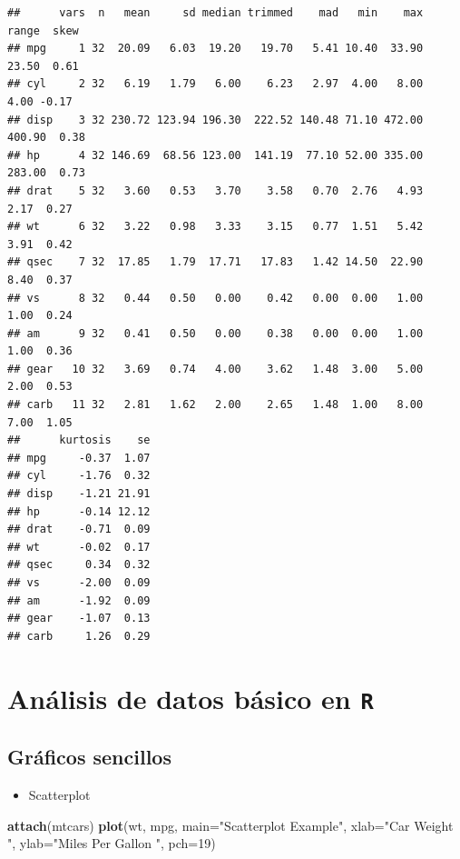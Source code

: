 \documentclass[]{article}
\def\tightlist{}
\newenvironment{Shaded}{\begin{snugshade}}{\end{snugshade}}
\newcommand{\KeywordTok}[1]{\textcolor[rgb]{0.13,0.29,0.53}{\textbf{{#1}}}}
\newcommand{\DataTypeTok}[1]{\textcolor[rgb]{0.13,0.29,0.53}{{#1}}}
\newcommand{\DecValTok}[1]{\textcolor[rgb]{0.00,0.00,0.81}{{#1}}}
\newcommand{\StringTok}[1]{\textcolor[rgb]{0.31,0.60,0.02}{{#1}}}
\newcommand{\NormalTok}[1]{{#1}}
\numberwithin{equation}{section}
\begin{document}
\begin{verbatim}
##      vars  n   mean     sd median trimmed    mad   min    max  range  skew
## mpg     1 32  20.09   6.03  19.20   19.70   5.41 10.40  33.90  23.50  0.61
## cyl     2 32   6.19   1.79   6.00    6.23   2.97  4.00   8.00   4.00 -0.17
## disp    3 32 230.72 123.94 196.30  222.52 140.48 71.10 472.00 400.90  0.38
## hp      4 32 146.69  68.56 123.00  141.19  77.10 52.00 335.00 283.00  0.73
## drat    5 32   3.60   0.53   3.70    3.58   0.70  2.76   4.93   2.17  0.27
## wt      6 32   3.22   0.98   3.33    3.15   0.77  1.51   5.42   3.91  0.42
## qsec    7 32  17.85   1.79  17.71   17.83   1.42 14.50  22.90   8.40  0.37
## vs      8 32   0.44   0.50   0.00    0.42   0.00  0.00   1.00   1.00  0.24
## am      9 32   0.41   0.50   0.00    0.38   0.00  0.00   1.00   1.00  0.36
## gear   10 32   3.69   0.74   4.00    3.62   1.48  3.00   5.00   2.00  0.53
## carb   11 32   2.81   1.62   2.00    2.65   1.48  1.00   8.00   7.00  1.05
##      kurtosis    se
## mpg     -0.37  1.07
## cyl     -1.76  0.32
## disp    -1.21 21.91
## hp      -0.14 12.12
## drat    -0.71  0.09
## wt      -0.02  0.17
## qsec     0.34  0.32
## vs      -2.00  0.09
## am      -1.92  0.09
## gear    -1.07  0.13
## carb     1.26  0.29
\end{verbatim}

\section{\texorpdfstring{Análisis de datos básico en
\texttt{R}}{Análisis de datos básico en R}}\label{analisis-de-datos-basico-en-r}

\subsection{Gráficos sencillos}\label{graficos-sencillos}

\begin{itemize}
\tightlist
\item
  Scatterplot
\end{itemize}

\begin{Shaded}
\begin{Highlighting}[]
\KeywordTok{attach}\NormalTok{(mtcars)}
\KeywordTok{plot}\NormalTok{(wt, mpg, }\DataTypeTok{main=}\StringTok{"Scatterplot Example"}\NormalTok{,}
   \DataTypeTok{xlab=}\StringTok{"Car Weight "}\NormalTok{, }\DataTypeTok{ylab=}\StringTok{"Miles Per Gallon "}\NormalTok{, }\DataTypeTok{pch=}\DecValTok{19}\NormalTok{) }
\end{Highlighting}
\end{Shaded}
\end{document}
